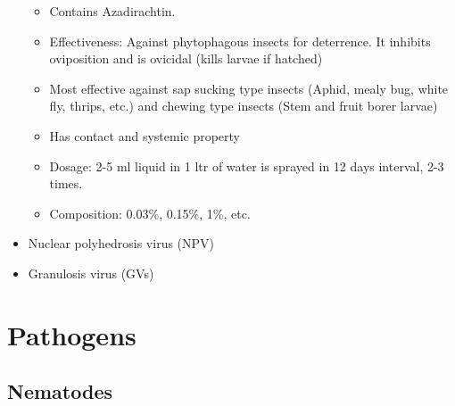 \documentclass[
]{book}
\providecommand{\tightlist}{%
  \setlength{\itemsep}{0pt}\setlength{\parskip}{0pt}}
\begin{document}
\begin{itemize}
  \begin{itemize}
  \tightlist
  \item
    Contains Azadirachtin.
  \item
    Effectiveness: Against phytophagous insects for deterrence. It inhibits oviposition and is ovicidal (kills larvae if hatched)
  \item
    Most effective against sap sucking type insects (Aphid, mealy bug, white fly, thrips, etc.) and chewing type insects (Stem and fruit borer larvae)
  \item
    Has contact and systemic property
  \item
    Dosage: 2-5 ml liquid in 1 ltr of water is sprayed in 12 days interval, 2-3 times.
  \item
    Composition: 0.03\%, 0.15\%, 1\%, etc.
  \end{itemize}
\item
  Nuclear polyhedrosis virus (NPV)
\item
  Granulosis virus (GVs)
\end{itemize}

\hypertarget{pathogens}{%
\section{Pathogens}\label{pathogens}}

\hypertarget{nematodes}{%
\subsection{Nematodes}\label{nematodes}}
\end{document}
